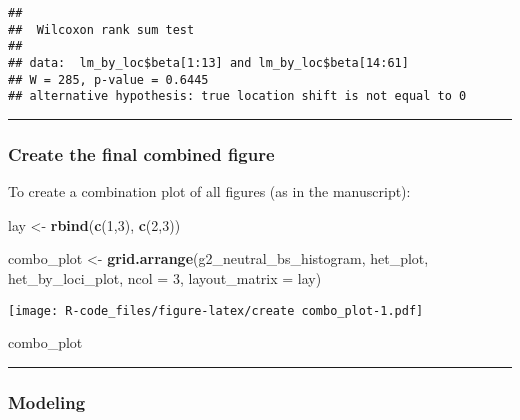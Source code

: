 \documentclass[]{article}
\newenvironment{Shaded}{\begin{snugshade}}{\end{snugshade}}
\newcommand{\KeywordTok}[1]{\textcolor[rgb]{0.13,0.29,0.53}{\textbf{#1}}}
\newcommand{\DataTypeTok}[1]{\textcolor[rgb]{0.13,0.29,0.53}{#1}}
\newcommand{\DecValTok}[1]{\textcolor[rgb]{0.00,0.00,0.81}{#1}}
\newcommand{\StringTok}[1]{\textcolor[rgb]{0.31,0.60,0.02}{#1}}
\newcommand{\NormalTok}[1]{#1}
\begin{document}
\begin{verbatim}
## 
##  Wilcoxon rank sum test
## 
## data:  lm_by_loc$beta[1:13] and lm_by_loc$beta[14:61]
## W = 285, p-value = 0.6445
## alternative hypothesis: true location shift is not equal to 0
\end{verbatim}

\begin{center}\rule{0.5\linewidth}{\linethickness}\end{center}

\subsubsection{Create the final combined
figure}\label{create-the-final-combined-figure}

To create a combination plot of all figures (as in the manuscript):

\begin{Shaded}
\begin{Highlighting}[]
\NormalTok{lay <-}\StringTok{ }\KeywordTok{rbind}\NormalTok{(}\KeywordTok{c}\NormalTok{(}\DecValTok{1}\NormalTok{,}\DecValTok{3}\NormalTok{),}
             \KeywordTok{c}\NormalTok{(}\DecValTok{2}\NormalTok{,}\DecValTok{3}\NormalTok{))}

\NormalTok{combo_plot <-}\StringTok{ }\KeywordTok{grid.arrange}\NormalTok{(g2_neutral_bs_histogram, }
\NormalTok{                           het_plot, }
\NormalTok{                           het_by_loci_plot, }\DataTypeTok{ncol =} \DecValTok{3}\NormalTok{, }\DataTypeTok{layout_matrix =}\NormalTok{ lay)}
\end{Highlighting}
\end{Shaded}

\texttt{[image: R-code\_files/figure-latex/create combo\_plot-1.pdf]}

\begin{Shaded}
\begin{Highlighting}[]
\NormalTok{combo_plot}
\end{Highlighting}
\end{Shaded}

\begin{center}\rule{0.5\linewidth}{\linethickness}\end{center}

\subsubsection{Modeling}\label{modeling}
\end{document}
